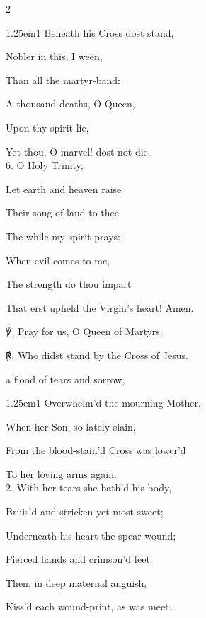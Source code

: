 \begin{paracol}{2}
\begin{hangparas}{1.25em}{1}
Beneath his Cross dost stand,

Nobler in this, I ween,

Than all the martyr-band:

A thousand deaths, O Queen,

Upon thy spirit lie,

Yet thou, O marvel! dost not die.\\

6. O Holy Trinity,

Let earth and heaven raise

Their song of laud to thee

The while my spirit prays:

When evil comes to me,

The strength do thou impart

That erst upheld the Virgin’s heart! Amen.\\
\end{hangparas}

℣. Pray for us, O Queen of Martyrs.

℟. Who didst stand by the Cross of Jesus.



\switchcolumn

\mattins
{}

\mattinsInvitatoryHymn
{} a flood of tears and sorrow,


\begin{hangparas}{1.25em}{1}
Overwhelm'd the mourning Mother,

When her Son, so lately slain,

From the blood-stain'd Cross was lower'd

To her loving arms again.\\

2. With her tears she bath'd his body,

Bruis'd and stricken yet most sweet;

Underneath his heart the spear-wound;

Pierced hands and crimson'd feet:

Then, in deep maternal anguish,

Kiss'd each wound-print, as was meet.\\


\end{hangparas}
\end{paracol}

